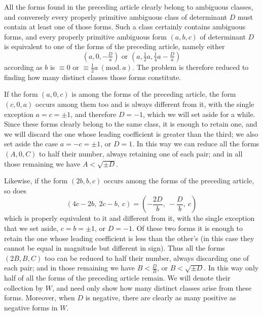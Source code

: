 All the forms found in the preceding article clearly belong to ambiguous classes, and conversely every properly primitive ambiguous class of determinant \(D\) must contain at least one of those forms. Such a class certainly contains ambiguous forms, and every properly primitive ambiguous form \((a,b,c)\) of determinant \(D\) is equivalent to one of the forms of the preceding article, namely either
\[
(a,0,-\tfrac{D}{a})\text{ or }(a,\tfrac12 a,\tfrac14 a-\tfrac{D}{a})
\]
according as \(b\) is \(\equiv0\) or \(\equiv\frac12 a\ (\mathrm{mod.}\,a)\). The problem is therefore reduced to finding how many distinct classes those forms constitute.

If the form \((a,0,c)\) is among the forms of the preceding article, the form \((c,0,a)\) occurs among them too and is always different from it, with the single exception \(a=c=\pm1\), and therefore \(D=-1\), which we will set aside for a while. Since these forms clearly belong to the same class, it is enough to retain one, and we will discard the one whose leading coefficient is greater than the third; we also set aside the case \(a=-c=\pm1\), or \(D=1\). In this way we can reduce all the forms
$(A,0,C)$ to half their number, always retaining one of each pair; and in all those remaining we have $A<\sqrt{\pm D}$.

Likewise, if the form $(2b,b,c)$ occurs among the forms of the preceding article, so does
\[
(4c-2b,\ 2c-b,\ c)=\left(-\frac{2D}{b},\ -\frac{D}{b},\ c\right)
\]
which is properly equivalent to it and different from it, with the single exception that we set aside, $c=b=\pm1$, or $D=-1$. Of these two forms it is enough to retain the one whose leading coefficient is less than the other's (in this case they cannot be equal in magnitude but different in sign). Thus all the forms $(2B,B,C)$ too can be reduced to half their number, always discarding one of each pair; and in those remaining we have $B<\frac{D}{B}$, or $B<\sqrt{\pm D}$. In this way only half of all the forms of the preceding article remain. We will denote their collection by $W$, and need only show how many distinct classes arise from these forms. Moreover, when $D$ is negative, there are clearly as many positive as negative forms in $W$.

